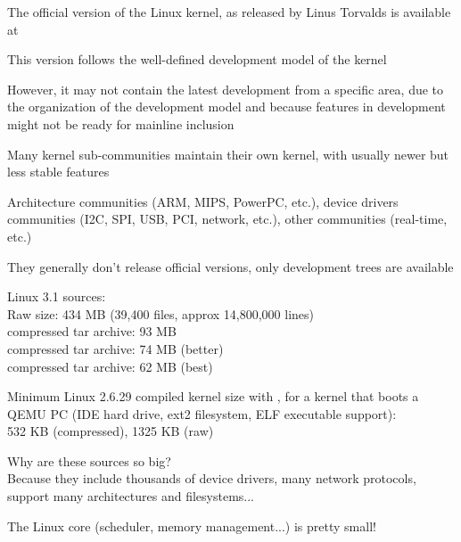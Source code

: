
  \startitemize
  \item The official version of the Linux kernel, as released by Linus
    Torvalds is available at 
    \startitemize
    \item This version follows the well-defined development model of
      the kernel
    \item However, it may not contain the latest development from a
      specific area, due to the organization of the development model
      and because features in development might not be ready for
      mainline inclusion
    \stopitemize
  \item Many kernel sub-communities maintain their own kernel, with
    usually newer but less stable features
    \startitemize
    \item Architecture communities (ARM, MIPS, PowerPC, etc.), device
      drivers communities (I2C, SPI, USB, PCI, network, etc.), other
      communities (real-time, etc.)
    \item They generally don't release official versions, only
      development trees are available
    \stopitemize
  \stopitemize

  \startitemize
  \item Linux 3.1 sources:\\
    Raw size: 434 MB (39,400 files, approx 14,800,000 lines)\\
     compressed tar archive: 93 MB\\
     compressed tar archive: 74 MB (better)\\
     compressed tar archive: 62 MB (best)
  \item Minimum Linux 2.6.29 compiled kernel size with
    , for a kernel that boots a QEMU PC (IDE
    hard drive, ext2 filesystem, ELF executable support):\\
    532 KB (compressed), 1325 KB (raw)
  \item Why are these sources so big?\\
    Because they include thousands of device drivers, many network
    protocols, support many architectures and filesystems...
  \item The Linux core (scheduler, memory management...) is pretty
    small!
  \stopitemize

